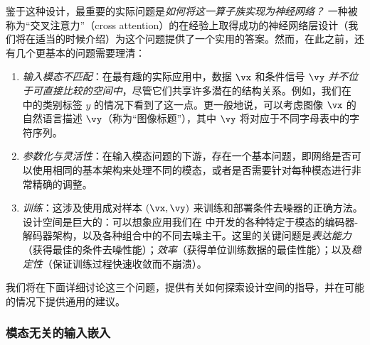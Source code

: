 \documentclass[../../book-main_zh.tex]{subfiles}
\begin{document}
鉴于这种设计，最重要的实际问题是\textit{如何将这一算子族实现为神经网络？}
一种被称为“交叉注意力”（cross attention）的在经验上取得成功的神经网络层设计（我们将在适当的时候介绍）为这个问题提供了一个实用的答案。然而，在此之前，还有几个更基本的问题需要理清：
\begin{enumerate}
    \item \textit{输入模态不匹配}：在最有趣的实际应用中，数据 $\vx$ 和条件信号 $\vy$
        \textit{并不位于可直接比较的空间中}，尽管它们共享许多潜在的结构关系。例如，我们在
         中的类别标签 $y$ 的情况下看到了这一点。更一般地说，可以考虑图像 $\vx$ 的自然语言描述 $\vy$（称为“图像标题”），其中 $\vy$ 将对应于不同字母表中的字符序列。
    \item \textit{参数化与灵活性}：在输入模态问题的下游，存在一个基本问题，即网络是否可以使用相同的基本架构来处理不同的模态，或者是否需要针对每种模态进行非常精确的调整。
    \item \textit{训练}：这涉及使用成对样本 $(\vx, \vy)$ 来训练和部署条件去噪器的正确方法。
        设计空间是巨大的：可以想象应用我们在
         中开发的各种特定于模态的编码器-解码器架构，以及各种组合中的不同去噪主干。这里的关键问题是\textit{表达能力}（获得最佳的条件去噪性能）；\textit{效率}（获得单位训练数据的最佳性能）；以及\textit{稳定性}（保证训练过程快速收敛而不崩溃）。
\end{enumerate}

我们将在下面详细讨论这三个问题，提供有关如何探索设计空间的指导，并在可能的情况下提供通用的建议。

\subsubsection{模态无关的输入嵌入}
\end{document}
